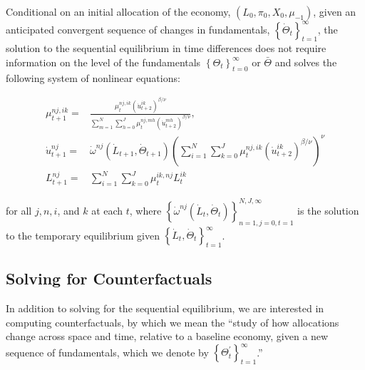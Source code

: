 \documentclass[10pt]{article}
\begin{document}
\begin{proposition} 
    Conditional on an initial allocation of the economy, 
    $\left(L_0, \pi_0, X_0, \mu_{-1}\right)$, given an anticipated 
    convergent sequence of changes in fundamentals, 
    $\left\{\dot{\Theta}_t\right\}_{t=1}^{\infty}$, the solution to the 
    sequential equilibrium in time differences does not require 
    information on the level of the fundamentals 
    $\left\{\Theta_t\right\}_{t=0}^{\infty}$ or $\bar{\Theta}$ and solves 
    the following system of nonlinear equations: 

    \begin{align}
        \mu_{t+1}^{n j, i k}=&\frac{\mu_t^{n j, i k}\left(\dot{u}_{t+2}^{i k}\right)^{\beta / \nu}}{\sum_{m=1}^N \sum_{h=0}^J \mu_t^{n j, m h}\left(\dot{u}_{t+2}^{m h}\right)^{\beta / \nu}}, \\
        \dot{u}_{t+1}^{n j}=&\dot{\omega}^{n j}\left(\dot{L}_{t+1}, \dot{\Theta}_{t+1}\right)\left(\sum_{i=1}^N \sum_{k=0}^J \mu_t^{n j, i k}\left(\dot{u}_{t+2}^{i k}\right)^{\beta / \nu}\right)^\nu \\
        L_{t+1}^{n j}=&\sum_{i=1}^N \sum_{k=0}^J \mu_t^{i k, n j} L_t^{i k}
    \end{align}

    for all $j, n, i$, and $k$ at each $t$, where $\left\{\dot{\omega}^{n j}\left(\dot{L}_t, \dot{\Theta}_t\right)\right\}_{n=1, j=0, t=1}^{N, J, \infty}$ is the solution to the temporary equilibrium given $\left\{\dot{L}_t, \dot{\Theta}_t\right\}_{t=1}^{\infty}$.

\end{proposition}

\subsection{Solving for Counterfactuals}

In addition to solving for the sequential equilibrium, we are 
interested in computing counterfactuals, 
by which we mean the 
``study of how allocations change across 
space and time, relative to a baseline 
economy, given a new sequence of fundamentals, 
which we denote by $\left\{\Theta_t^{\prime}\right\}_{t=1}^{\infty}$.''



\end{document}
